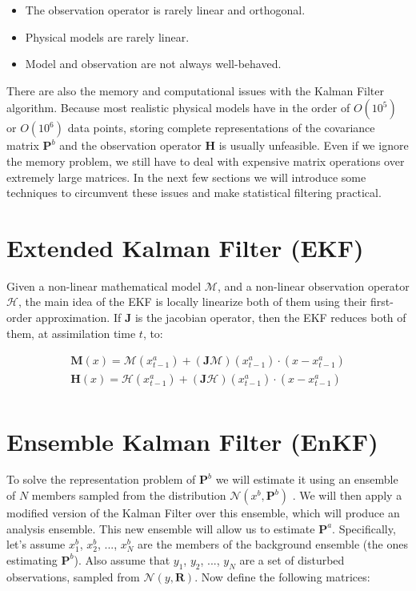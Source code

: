 \documentclass{article}
\begin{document}
\begin{itemize}
\item The observation operator is rarely linear and orthogonal.
\item Physical models are rarely linear.
\item Model and observation are not always well-behaved.
\end{itemize}

There are also the memory and computational issues with the Kalman Filter algorithm. Because most realistic physical models have in the order of $O(10^5)$ or $O(10^6)$ data points, storing complete representations of the covariance matrix $\mathbf{P}^b$ and the observation operator $\mathbf{H}$ is usually unfeasible. Even if we ignore the memory problem, we still have to deal with expensive matrix operations over extremely large matrices. In the next few sections we will introduce some techniques to circumvent these issues and make statistical filtering practical. \\

\section{Extended Kalman Filter (EKF)}

Given a non-linear mathematical model $\mathcal{M}$, and a non-linear observation operator $\mathcal{H}$, the main idea of the EKF \cite{Terejanu} is locally linearize both of them using their first-order approximation. If $\mathbf{J}$ is the jacobian operator, then the EKF reduces both of them, at assimilation time $t$, to:

\begin{gather*}
\mathbf{M} (x) = \mathcal{M} (x_{t - 1}^a) + (\mathbf{J} \mathcal{M}) (x_{t - 1}^a) \cdot (x - x_{t - 1}^a) \\
\mathbf{H} (x) = \mathcal{H} (x_{t - 1}^a) + (\mathbf{J} \mathcal{H}) (x_{t - 1}^a) \cdot (x - x_{t - 1}^a) \\
\end{gather*}

\section{Ensemble Kalman Filter (EnKF)}

To solve the representation problem of $\mathbf{P}^b$ we will estimate it using an ensemble of $N$ members sampled from the distribution $\mathcal{N} (x^b, \mathbf{P}^b)$ \cite{Mandel2009}. We will then apply a modified version of the Kalman Filter over this ensemble, which will produce an analysis ensemble. This new ensemble will allow us to estimate $\mathbf{P}^a$. Specifically, let's assume $x_1^b$, $x_2^b$, ..., $x_N^b$ are the members of the background ensemble (the ones estimating $\mathbf{P}^b$). Also assume that $y_1$, $y_2$, ..., $y_N$ are a set of disturbed observations, sampled from $\mathcal{N} (y, \mathbf{R})$. Now define the following matrices:
\end{document}
